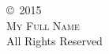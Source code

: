 \phantom{}\vspace{\fill}
\begin{center}
\copyright~2015\\
\textsc{My Full Name}\\
All Rights Reserved\\
\end{center}